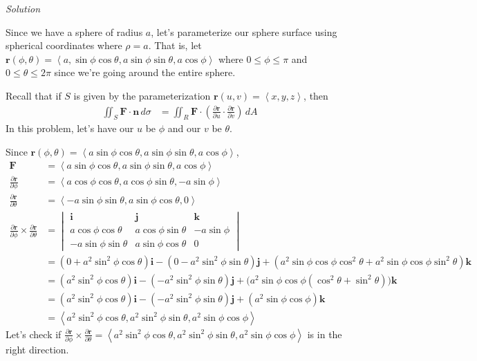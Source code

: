 \documentclass{article}
\newcommand{\lrp}[1]{\left( #1 \right)}
\newcommand{\lra}[1]{\left\langle #1 \right\rangle}
\renewcommand{\i}[0]{\mathbf{i}}
\renewcommand{\j}[0]{\mathbf{j}}
\renewcommand{\k}[0]{\mathbf{k}}
\renewcommand{\r}[0]{\mathbf{r}}
\newcommand{\F}[0]{\mathbf{F}}
\newcommand{\n}[0]{\mathbf{n}}
\newcommand{\Solution}{\textit{Solution}}
\begin{document}
\Solution

Since we have a sphere of radius $a$, let's parameterize our sphere surface using spherical coordinates where $\rho = a$. That is, let $\r(\phi,\theta)=\lra{a,\sin\phi\cos\theta, a\sin\phi\sin\theta, a\cos\phi}$ where $0\leq \phi \leq \pi$ and $0\leq \theta\leq 2\pi$ since we're going around the entire sphere.


Recall that if $S$ is given by the parameterization $\r(u,v)=\lra{x,y,z}$, then
\begin{align*}
    \iint_S \F\cdot \n \,d\sigma &= \iint_R \F \cdot \lrp{\frac{\partial \r}{\partial u}\cdot \frac{\partial \r}{\partial v}}\,dA
\end{align*}
In this problem, let's have our $u$ be $\phi$ and our $v$ be $\theta$.

Since $\r(\phi,\theta)=\lra{a\sin\phi\cos\theta, a\sin\phi\sin\theta, a\cos\phi}$,
\begin{align*}
\F&=\lra{a\sin\phi\cos\theta, a\sin\phi\sin\theta, a\cos\phi}\\
    \frac{\partial \r}{\partial \phi}&=\lra{a\cos\phi\cos\theta, a\cos\phi\sin\theta, -a\sin\phi}\\
    \frac{\partial \r }{\partial \theta}&=\lra{-a\sin\phi\sin\theta, a\sin\phi\cos\theta, 0}\\
    \frac{\partial \r}{\partial \phi}\times  \frac{\partial \r }{\partial \theta}&=\begin{vmatrix}\i & \j & \k \\ a\cos\phi\cos\theta & a\cos\phi\sin\theta & -a\sin\phi \\ -a\sin\phi\sin\theta & a\sin\phi\cos\theta & 0\end{vmatrix}\\
    &=\lrp{0+a^2\sin^2\phi\cos\theta}\i-\lrp{0-a^2\sin^2\phi\sin\theta}\j +\lrp{a^2\sin\phi\cos\phi\cos^2\theta+a^2\sin\phi\cos\phi\sin^2\theta}\k\\
    &=\lrp{a^2\sin^2\phi\cos\theta}\i-\lrp{-a^2\sin^2\phi\sin\theta}\j + \big(a^2\sin\phi\cos\phi\lrp{\cos^2\theta+\sin^2\theta}\big)\k\\
    &=\lrp{a^2\sin^2\phi\cos\theta}\i-\lrp{-a^2\sin^2\phi\sin\theta}\j +\lrp{a^2\sin\phi\cos\phi}\k\tag{$\cos^2\theta+\sin^2\theta=1$}\\
    &=\lra{a^2\sin^2\phi\cos\theta, a^2\sin^2\phi\sin\theta, a^2\sin\phi\cos\phi}
    \end{align*}
Let's check if $\displaystyle \frac{\partial \r}{\partial \phi}\times  \frac{\partial \r }{\partial \theta}=\lra{a^2\sin^2\phi\cos\theta, a^2\sin^2\phi\sin\theta, a^2\sin\phi\cos\phi}$ is in the right direction.
\end{document}
